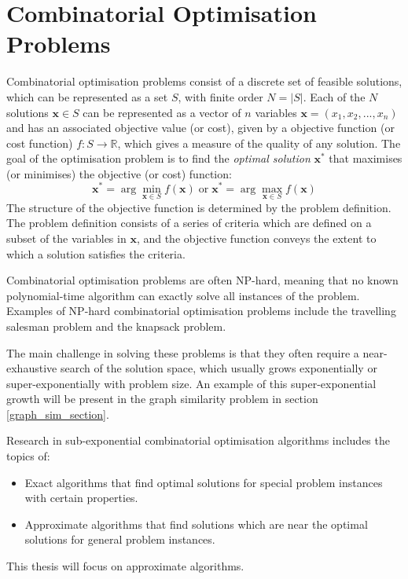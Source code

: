 \section{Combinatorial Optimisation Problems}
Combinatorial optimisation problems consist of a discrete set of feasible solutions, which can be represented as a set $S$, with finite order $N=|S|$. Each of the $N$ solutions $\mathbf{x} \in S$ can be represented as a vector of $n$ variables $\mathbf{x}=(x_1, x_2,...,x_n)$ and has an associated objective value (or cost), given by a objective function (or cost function) $f:S\rightarrow\mathbb{R}$, which gives a measure of the quality of any solution. The goal of the optimisation problem is to find the \textit{optimal solution} $\mathbf{x}^*$ that maximises (or minimises) the objective (or cost) function:
$$\mathbf{x}^* = \arg\min_{\mathbf{x} \in S} f(\mathbf{x})
\;\text{or}\;
\mathbf{x}^* = \arg\max_{\mathbf{x} \in S} f(\mathbf{x})$$
The structure of the objective function is determined by the problem definition. The problem definition consists of a series of criteria which are defined on a subset of the variables in $\mathbf{x}$, and the objective function conveys the extent to which a solution satisfies the criteria.

Combinatorial optimisation problems are often NP-hard, meaning that no known polynomial-time algorithm can exactly solve all instances of the problem. Examples of NP-hard combinatorial optimisation problems include the travelling salesman problem and the knapsack problem.

The main challenge in solving these problems is that they often require a near-exhaustive search of the solution space, which usually grows exponentially or super-exponentially with problem size. An example of this super-exponential growth will be present in the graph similarity problem in section \ref{graph_sim_section}.

Research in sub-exponential combinatorial optimisation algorithms includes the topics of:
\begin{itemize}
    \item Exact algorithms that find optimal solutions for special problem instances with certain properties.
    \item Approximate algorithms that find solutions which are near the optimal solutions for general problem instances.
\end{itemize}

This thesis will focus on approximate algorithms.


